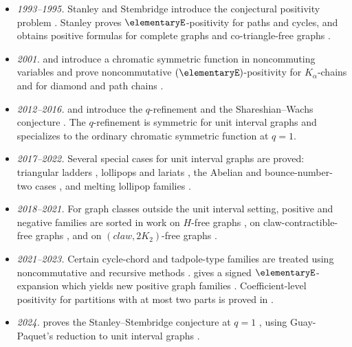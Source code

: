 \begin{itemize}
\item
\emph{1993--1995.}
Stanley and Stembridge introduce the conjectural positivity problem
\cite{StanleyStembridge1993}. Stanley proves $\elementaryE$-positivity for
paths and cycles, and obtains positive formulas for complete graphs and
co-triangle-free graphs \cite{Stanley1995}.

\item
\emph{2001.}
 and  introduce a chromatic symmetric
function in noncommuting variables and prove noncommutative
$(\elementaryE)$-positivity for $K_\alpha$-chains and for diamond and path
chains \cite{GebhardSagan2001}.

\item
\emph{2012--2016.}
 and  introduce the
$q$-refinement and the Shareshian--Wachs conjecture
\cite{ShareshianWachs2012,ShareshianWachs2016}.  The $q$-refinement is
symmetric for unit interval graphs and specializes to the ordinary chromatic
symmetric function at $q=1$.

\item
\emph{2017--2022.}
Several special cases for unit interval graphs are proved: triangular ladders
\cite{Dahlberg2018x}, lollipops and lariats \cite{DahlbergWilligenburg2018},
the Abelian and bounce-number-two cases
\cite{HaradaPrecup2019,ChoHuh2019,NadeauTewari2022x,LeeSoh2022x}, and
melting lollipop families \cite{HuhNamYoo2020}.

\item
\emph{2018--2021.}
For graph classes outside the unit interval setting, positive and negative
families are sorted in work on $H$-free graphs
\cite{Tsujie2018,HamelHoangTuero2019,FoleyHoangMerkel2019}, on
claw-contractible-free graphs \cite{DahlbergFoleyWilligenburg2020}, and on
$(claw,2K_2)$-free graphs \cite{LiYang2021}.

\item
\emph{2021--2023.}
Certain cycle-chord and tadpole-type families are treated using
noncommutative and recursive methods \cite{WangWang2022}.
 gives a signed
$\elementaryE$-expansion which yields new positive graph families
\cite{Tom2023x}.  Coefficient-level positivity for partitions with at most two
parts is proved in \cite{AbreuNigro2023x,RokSzenes2023x}.

\item
\emph{2024.}
 proves the Stanley--Stembridge conjecture at $q=1$
\cite{Hikita2024x}, using Guay-Paquet's reduction to unit interval graphs
\cite{GuayPaquet2013}.


\end{itemize}
